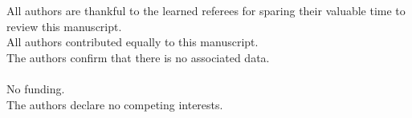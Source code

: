 \documentclass[10pt, reqno]{amsart}
\theoremstyle{definition}
\theoremstyle{remark}
\numberwithin{equation}{section}
\begin{document}
 All authors are thankful to the learned referees for sparing their valuable time to review this manuscript.\\

 All authors contributed equally to this manuscript.\\

 The authors confirm that there is no associated data.\\

\\

 No funding.\\

 The authors declare no competing interests.
	
\end{document}
